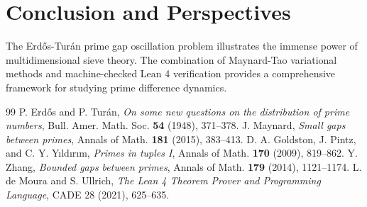 \documentclass[11pt,a4paper]{article}
\theoremstyle{definition}
\begin{document}
\section{Conclusion and Perspectives}
The Erd\H{o}s-Tur\'an prime gap oscillation problem illustrates the immense power of multidimensional sieve theory. The combination of Maynard-Tao variational methods and machine-checked Lean 4 verification provides a comprehensive framework for studying prime difference dynamics.

\begin{thebibliography}{99}
 P. Erd\H{o}s and P. Tur\'an, \textit{On some new questions on the distribution of prime numbers}, Bull. Amer. Math. Soc. \textbf{54} (1948), 371--378.
 J. Maynard, \textit{Small gaps between primes}, Annals of Math. \textbf{181} (2015), 383--413.
 D. A. Goldston, J. Pintz, and C. Y. Y{\i}ld{\i}r{\i}m, \textit{Primes in tuples I}, Annals of Math. \textbf{170} (2009), 819--862.
 Y. Zhang, \textit{Bounded gaps between primes}, Annals of Math. \textbf{179} (2014), 1121--1174.
 L. de Moura and S. Ullrich, \textit{The Lean 4 Theorem Prover and Programming Language}, CADE 28 (2021), 625--635.
\end{thebibliography}
\end{document}
